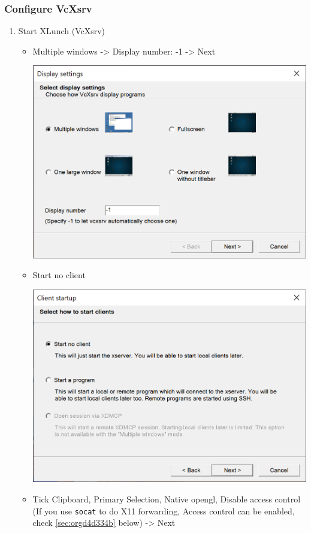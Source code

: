 \documentclass[10pt]{article}
\begin{document}
\subsubsection{Configure VcXsrv}
\label{sec:org1f3684b}
\begin{enumerate}
\item Start XLunch (VcXsrv)
\begin{itemize}
\item Multiple windows -> Display number: -1 -> Next
\begin{center}
\includegraphics[width=.9\linewidth]{vcxsrv-1.png}
\end{center}
\item Start no client
\begin{center}
\includegraphics[width=.9\linewidth]{vcxsrv-2.png}
\end{center}
\item Tick Clipboard, Primary Selection, Native opengl, Disable access control (If you use \texttt{socat} to do X11 forwarding, Access control can be enabled, check \ref{sec:orgd4d334b} below) -> Next

\end{itemize}
\end{enumerate}
\end{document}
